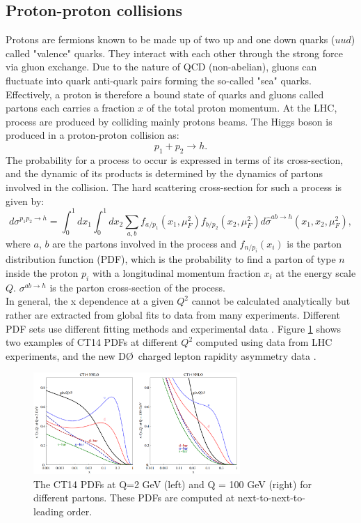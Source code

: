 \subsection{Proton-proton collisions}
\label{chap1:H2012:PP}
Protons are fermions known to be made up of two up and one down quarks ($uud$) called "valence" quarks. They interact with each other through the strong force via gluon exchange. Due to the nature of QCD (non-abelian), gluons can fluctuate into quark anti-quark pairs forming the so-called "sea" quarks. Effectively, a proton is therefore a bound state of quarks and gluons called partons each carries a fraction $x$ of the total proton momentum. At the LHC, process are produced by colliding mainly protons beams. The Higgs boson is produced in a proton-proton collision as:
\begin{equation}
    p_1 + p_2 \rightarrow h.
\end{equation}
The probability for a process to occur is expressed in terms of its cross-section, and the dynamic of its products is determined by the dynamics of partons involved in the collision. The hard scattering cross-section for such a process is given by:
\begin{equation}
    d \sigma^{p_{1} p_{2} \rightarrow h}=\int_{0}^{1} d x_{1} \int_{0}^{1} d x_{2} \sum_{a, b} f_{a / p_{1}}\left(x_{1}, \mu_{F}^{2}\right) f_{b / p_{2}}\left(x_{2}, \mu_{F}^{2}\right) d \hat{\sigma}^{a b \rightarrow h}\left(x_1, x_2, \mu_{F}^{2}\right), 
\end{equation}
where $a$, $b$ are the partons involved in the process and $f_{n/p_i}(x_i)$ is the parton distribution function (PDF), which is the probability to find a parton of type $n$ inside the proton $p_i$ with a longitudinal momentum fraction $x_i$ at the energy scale $Q$. $\sigma^{a b \rightarrow h}$ is the parton cross-section of the process. \\
In general, the x dependence at a given $Q^2$ cannot be calculated analytically but rather are extracted from global fits to data from many experiments. Different PDF sets use different fitting methods and experimental data \cite{PDF}. Figure \ref{fig:chap1:H2012:PDF} shows two examples of CT14 PDFs at different $Q^2$ computed using data from LHC experiments, and the new D\O \ charged lepton rapidity asymmetry data \cite{CT14}. 
\begin{figure}[htbp]
    \centering
    \includegraphics[width=0.7\textwidth]{Ch1/Img/pdf_CT14_NNLO.png}
    \caption{The CT14 PDFs at Q=2 GeV (left) and Q = 100 GeV (right) for different partons. These PDFs are computed at next-to-next-to-leading order.}
    \label{fig:chap1:H2012:PDF}
\end{figure}
